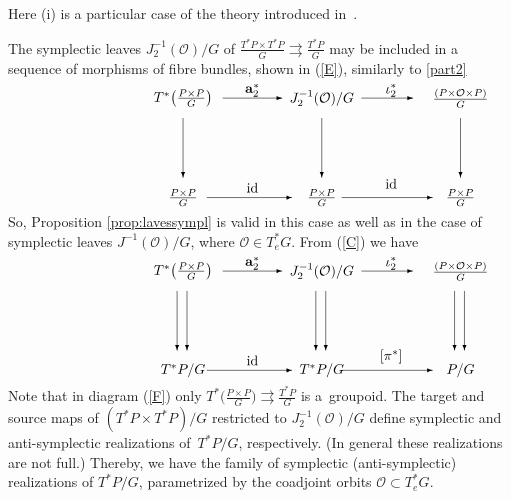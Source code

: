 \documentclass[pdftex]{sigma}
\renewcommand{\O}{\mathcal{O}}
\newcommand{\tto}{\rightrightarrows}
\DeclareMathOperator{\anch}{\mathbf{a}}
\newcommand{\id}{\text{\upshape id}}
\numberwithin{equation}{section}
\begin{document}
Here (i) is a particular case of the theory introduced in~\cite{Weinstein:1987}.

The symplectic leaves $J_2^{-1}(\O)/G$ of $\frac{T^*P\times T^*P}{G}\tto \frac{T^*P}{G}$ may be included in a sequence of morphisms of f\/ibre bundles, shown in (\ref{E}), similarly to \eqref{part2}
\begin{gather}\label{E}\begin{split}&\unitlength=5mm\begin{picture}(11,5.6)(-4,0)
 \put(-2,5){\makebox(0,0){$T^*\big(\frac{P\times P}{G}\big)$}}
 \put(5,5){\makebox(0,0){$J_2^{-1}(\O)/G$}}
 \put(12,5){\makebox(0,0){$\frac{(P\times \O \times P)}{G}$}}
 \put(-2,0){\makebox(0,0){$\frac{P\times P}{G}$}}
 \put(5,0){\makebox(0,0){$\frac{P\times P}{G}$}}
 \put(12,0){\makebox(0,0){$\frac{P\times P}{G}$}}
 \put(5,4){\vector(0,-1){3}}
 \put(-2,4){\vector(0,-1){3}}
 \put(12,4){\vector(0,-1){3}}
 \put(7,5){\vector(1,0){2.6}}
 \put(6,0){\vector(1,0){4.6}}
 \put(-0.8,0){\vector(1,0){4.3}}
 \put(0,5){\vector(1,0){3}}
 \put(8.5,5.4){\makebox(0,0){$\iota_2^* $}}
 \put(8.5,0.7){\makebox(0,0){$\id$}}
\put(1.5,0.5){\makebox(0,0){$ \id $}}
\put(1.5,5.4){\makebox(0,0){$\anch_2^* $}}
 \end{picture}\end{split}\end{gather}
So, Proposition \ref{prop:lavessympl} is valid in this case as well as in the case of symplectic leaves $J^{-1}(\O)/G$, where $\O\in T^*_eG$. From (\ref{C}) we have
\begin{gather}\label{F}\begin{split}&\unitlength=5mm\begin{picture}(11,5.6)(-4,0)
 \put(-2,5){\makebox(0,0){$T^*\big(\frac{P\times P}{G}\big)$}}
 \put(5,5){\makebox(0,0){$J_2^{-1}(\O)/G$}}
 \put(12,5){\makebox(0,0){$\frac{(P\times \O \times P)}{G}$}}
 \put(-2,0){\makebox(0,0){$T^*P/G$}}
 \put(5,0){\makebox(0,0){$T^*P/G$}}
 \put(12,0){\makebox(0,0){$P/G$}}
 \put(5.2,4){\vector(0,-1){3}}
 \put(4.7,4){\vector(0,-1){3}}
 \put(-2.3,4){\vector(0,-1){3}}
 \put(-1.8,4){\vector(0,-1){3}}
 \put(12.2,4){\vector(0,-1){3}}
 \put(11.7,4){\vector(0,-1){3}}
 \put(7,5){\vector(1,0){2.6}}
 \put(6,0){\vector(1,0){4.6}}
 \put(-0.8,0){\vector(1,0){4.3}}
 \put(0,5){\vector(1,0){3}}
 \put(8.5,5.4){\makebox(0,0){$\iota_2^* $}}
 \put(8.5,0.7){\makebox(0,0){$[\pi^*]$}}
\put(1.5,0.5){\makebox(0,0){$ \id$}}
\put(1.5,5.4){\makebox(0,0){$\anch_2^* $}}
 \end{picture}\end{split}\end{gather}
Note that in diagram (\ref{F}) only $T^*\big(\frac{P\times P}{G}\big)\tto \frac{T^*P}{G}$ is a~groupoid. The target and source maps of $(T^*P\times T^*P)/G$ restricted to $J_2^{-1}(\O)/G$ def\/ine symplectic and anti-symplectic realizations of~$T^*P/G$, respectively. (In general these realizations are not full.) Thereby, we have the family of symplectic (anti-symplectic) realizations of $T^*P/G$, parametrized by the coadjoint orbits $\O\subset T^*_eG$.
\end{document}
